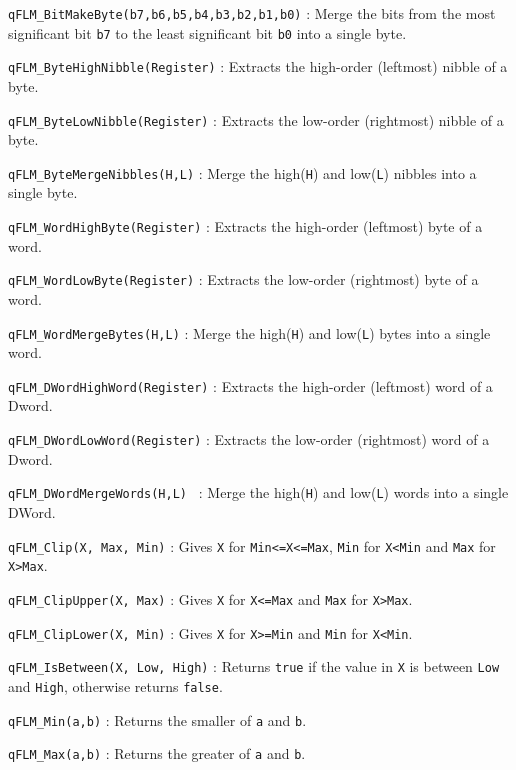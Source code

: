 \lstinline{qFLM_BitMakeByte(b7,b6,b5,b4,b3,b2,b1,b0)} : Merge the bits from the most significant bit \lstinline{b7} to the least significant bit \lstinline{b0} into a single byte.

\lstinline{qFLM_ByteHighNibble(Register)} : Extracts the  high-order (leftmost) nibble of a byte.

\lstinline{qFLM_ByteLowNibble(Register)} : Extracts the low-order (rightmost) nibble of a byte.

\lstinline{qFLM_ByteMergeNibbles(H,L)} :  Merge the high(\lstinline{H}) and low(\lstinline{L}) nibbles into a single byte.

\lstinline{qFLM_WordHighByte(Register)} : Extracts the high-order (leftmost) byte of a word.

\lstinline{qFLM_WordLowByte(Register)} : Extracts the low-order (rightmost) byte of a word.

\lstinline{qFLM_WordMergeBytes(H,L)} : Merge the high(\lstinline{H}) and low(\lstinline{L}) bytes into a single word.

\lstinline{qFLM_DWordHighWord(Register)} : Extracts the high-order (leftmost) word of a Dword.

\lstinline{qFLM_DWordLowWord(Register)} : Extracts the low-order (rightmost) word of a Dword.

\lstinline{qFLM_DWordMergeWords(H,L) } : Merge the high(\lstinline{H}) and low(\lstinline{L}) words into a single DWord.

\lstinline{qFLM_Clip(X, Max, Min)} :  Gives \lstinline{X} for \lstinline{Min<=X<=Max}, \lstinline{Min} for \lstinline{X<Min} and \lstinline{Max} for \lstinline{X>Max}.

\lstinline{qFLM_ClipUpper(X, Max)} : Gives \lstinline{X} for \lstinline{X<=Max} and \lstinline{Max} for \lstinline{X>Max}.

\lstinline{qFLM_ClipLower(X, Min)} : Gives \lstinline{X} for \lstinline{X>=Min} and \lstinline{Min} for \lstinline{X<Min}.

\lstinline{qFLM_IsBetween(X, Low, High)} : Returns \lstinline{true} if the value in \lstinline{X} is between \lstinline{Low} and \lstinline{High}, otherwise returns \lstinline{false}.

\lstinline{qFLM_Min(a,b)} : Returns the smaller of \lstinline{a} and \lstinline{b}.

\lstinline{qFLM_Max(a,b)} :  Returns the greater of \lstinline{a} and \lstinline{b}.

\newpage